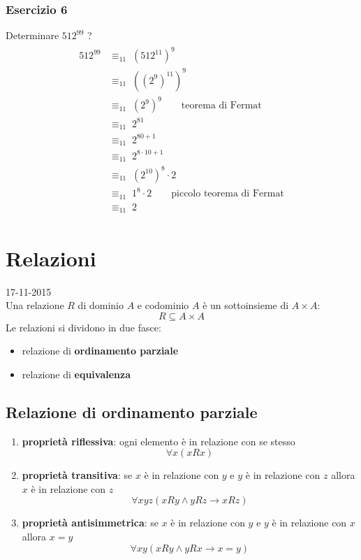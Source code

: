 \documentclass[italian]{article}
\newcommand{\congruente}[1]{\text{$\equiv_{#1}\;$}}
\newcommand{\tright}[1]{\hfill #1 \\}
\begin{document}
\subsubsection{Esercizio 6}
Determinare $512^{99}$ \congruente{11} ?
\begin{gather*}
\begin{split}
512^{99} &\congruente{11} (512^{11})^ 9 \\
	&\congruente{11} \left((2^9)^{11}\right)^9 \\
	&\congruente{11} (2^9)^9 \qquad \text{teorema di Fermat}\\
	&\congruente{11} 2^{81} \\
	&\congruente{11} 2^{80 + 1} \\
	&\congruente{11} 2^{8\cdot 10 + 1} \\
	&\congruente{11} (2^{10})^8 \cdot 2 \\
	&\congruente{11} 1^8 \cdot 2 \qquad \text{piccolo teorema di Fermat} \\
	&\congruente{11} 2
\end{split}
\end{gather*}

\newpage
\section{Relazioni}
\tright{17-11-2015}
Una relazione $R$ di dominio $A$ e codominio $A$ è un sottoinsieme di $A\times A$:
\[
	R \subseteq A \times A
\]
Le relazioni si dividono in due fasce:
\begin{itemize}
	\item relazione di \textbf{ordinamento parziale}
	\item relazione di \textbf{equivalenza}
\end{itemize}
\subsection{Relazione di ordinamento parziale}
\begin{enumerate}
	\item \textbf{proprietà riflessiva}: ogni elemento è in relazione con se stesso
		\[
			\forall x(xRx)
		\]
	\item \textbf{proprietà transitiva}: se $x$ è in relazione con $y$ e $y$ è in relazione con $z$ allora $x$ è in relazione con $z$
		\[
			\forall xyz (xRy \land yRz \to xRz)
		\]  
	\item \textbf{proprietà antisimmetrica}: se $x$ è in relazione con $y$ e $y$ è in relazione con $x$ allora $x=y$
		\[
			\forall xy (xRy \land yRx \to x=y)
		\]
\end{enumerate}
	
\end{document}
